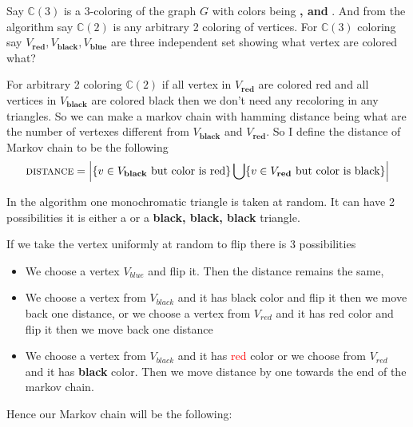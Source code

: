 \documentclass[addpoints,12pt]{exam}
\begin{document}
\begin{questions}
\begin{parts}
\begin{solution}
                Say $\mathbb{C}(3)$ is a 3-coloring of the graph $G$ with colors being \textbf{\color{red}{red}, \color{black}{black} and \color{blue}{blue}}. And from the algorithm say $\mathbb{C}(2)$ is any arbitrary 2 coloring of vertices. For $\mathbb{C}(3)$ coloring say $V_{\textbf{red}}, V_{\textbf{black}}, V_{\textbf{blue}}$ are three independent set showing what vertex are colored what?

                For arbitrary 2 coloring $\mathbb{C}(2)$ if all vertex in $V_{\textbf{red}}$ are colored red and all vertices in $V_{\textbf{black}}$ are colored black then we don't need any recoloring in any triangles. So we can make a markov chain with hamming distance being what are the number of vertexes different from $V_{\textbf{black}}$ and $V_{\textbf{red}}$. So I define the distance of Markov chain to be the following
                \begin{align*}
                    \textsc{distance} = \Big\vert \{v \in V_{\textbf{black}} \text{ but color is red}\} \bigcup \{v \in V_{\textbf{red}} \text{ but color is black}\} \Big\vert
                \end{align*}

                In the algorithm one monochromatic triangle is taken at random. It can have 2 possibilities it is either a \textbf{\color{red}{red, red, red}} or a \textbf{black, black, black} triangle.

                If we take the vertex uniformly at random to flip there is 3 possibilities
                \begin{itemize}
                    \item We choose a vertex $V_{blue}$ and flip it. Then the distance remains the same,
                    \item We choose a vertex from $V_{black}$ and it has black color and flip it then we move back one distance, or we choose a vertex from $V_{red}$ and it has red color and flip it then we move back one distance
                    \item We choose a vertex from $V_{black}$ and it has \textcolor{red}{red} color or we choose from $V_{red}$ and it has \textbf{black} color. Then we move distance by one towards the end of the markov chain.
                \end{itemize}
                \bigskip
                
                Hence our Markov chain will be the following:\\
                

\end{solution}
\end{parts}
\end{questions}
\end{document}
